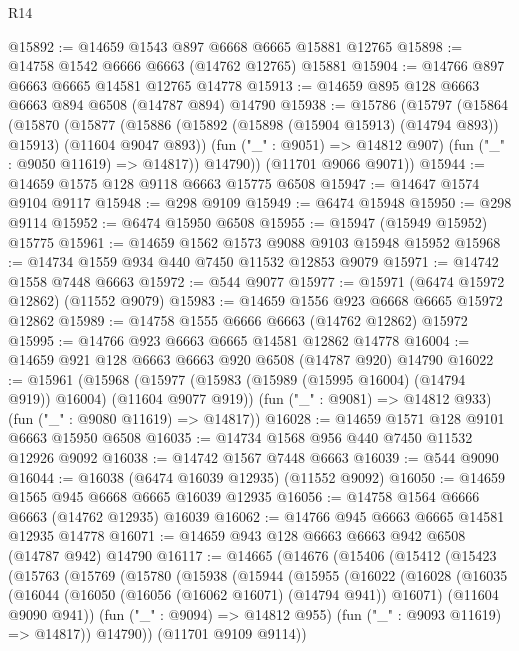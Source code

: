 \begin{lexlean}{R14}
\begin{coremodule}
{{{{{{{{{{{{{{{{{{{{{{{{{{{{{{{{{{{{{{{{{{{{{{{{{{{{{{{{{{{{{{{{{{{{{{{{{{{{{{{{{{@15892 := @14659 @1543 @897 @6668 @6665 @15881 @12765
@15898 := @14758 @1542 @6666 @6663 (@14762 @12765) @15881
@15904 := @14766 @897 @6663 @6665 @14581 @12765 @14778
@15913 := @14659 @895 @128 @6663 @6663 @894 @6508 (@14787 @894) @14790
@15938 := @15786
    (@15797
      (@15864
        (@15870
          (@15877
            (@15886 (@15892 (@15898 (@15904 @15913) (@14794 @893)) @15913) (@11604 @9047 @893))
            (fun ("_" : @9051) => @14812 @907)
            (fun ("_" : @9050 @11619) => @14817))
          @14790))
      (@11701 @9066 @9071))
@15944 := @14659 @1575 @128 @9118 @6663 @15775 @6508
@15947 := @14647 @1574 @9104 @9117
@15948 := @298 @9109
@15949 := @6474 @15948
@15950 := @298 @9114
@15952 := @6474 @15950 @6508
@15955 := @15947 (@15949 @15952) @15775
@15961 := @14659 @1562 @1573 @9088 @9103 @15948 @15952
@15968 := @14734 @1559 @934 @440 @7450 @11532 @12853 @9079
@15971 := @14742 @1558 @7448 @6663
@15972 := @544 @9077
@15977 := @15971 (@6474 @15972 @12862) (@11552 @9079)
@15983 := @14659 @1556 @923 @6668 @6665 @15972 @12862
@15989 := @14758 @1555 @6666 @6663 (@14762 @12862) @15972
@15995 := @14766 @923 @6663 @6665 @14581 @12862 @14778
@16004 := @14659 @921 @128 @6663 @6663 @920 @6508 (@14787 @920) @14790
@16022 := @15961
    (@15968
      (@15977 (@15983 (@15989 (@15995 @16004) (@14794 @919)) @16004) (@11604 @9077 @919))
      (fun ("_" : @9081) => @14812 @933)
      (fun ("_" : @9080 @11619) => @14817))
@16028 := @14659 @1571 @128 @9101 @6663 @15950 @6508
@16035 := @14734 @1568 @956 @440 @7450 @11532 @12926 @9092
@16038 := @14742 @1567 @7448 @6663
@16039 := @544 @9090
@16044 := @16038 (@6474 @16039 @12935) (@11552 @9092)
@16050 := @14659 @1565 @945 @6668 @6665 @16039 @12935
@16056 := @14758 @1564 @6666 @6663 (@14762 @12935) @16039
@16062 := @14766 @945 @6663 @6665 @14581 @12935 @14778
@16071 := @14659 @943 @128 @6663 @6663 @942 @6508 (@14787 @942) @14790
@16117 := @14665
    (@14676
      (@15406
        (@15412
          (@15423
            (@15763
              (@15769
                (@15780
                  (@15938
                    (@15944
                      (@15955
                        (@16022
                          (@16028
                            (@16035
                              (@16044
                                (@16050 (@16056 (@16062 @16071) (@14794 @941)) @16071)
                                (@11604 @9090 @941))
                              (fun ("_" : @9094) => @14812 @955)
                              (fun ("_" : @9093 @11619) => @14817))
                            @14790))
                        (@11701 @9109 @9114))
}}}}}}}}}}}}}}}}}}}}}}}}}}}}}}}}}}}}}}}}}}}}}}}}}}}}}}}}}}}}}}}}}}}}}}}}}}}}}}}}}}
\end{coremodule}
\end{lexlean}

